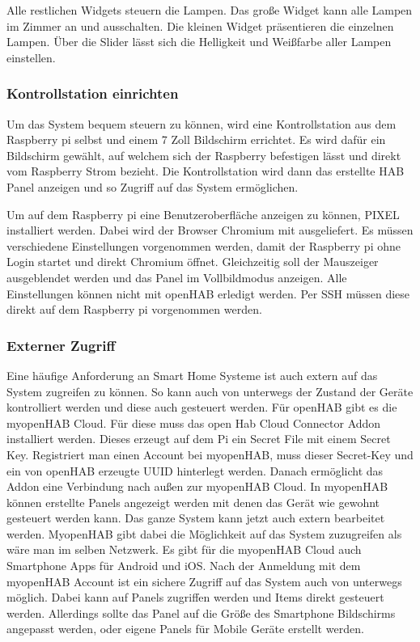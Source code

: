 		Alle restlichen Widgets steuern die Lampen. Das große Widget kann alle Lampen im Zimmer an und ausschalten. Die kleinen Widget präsentieren die einzelnen Lampen. Über die Slider lässt sich die Helligkeit und Weißfarbe aller Lampen einstellen.
		
		\subsubsection{Kontrollstation einrichten}
		Um das System bequem steuern zu können, wird eine Kontrollstation aus dem Raspberry pi selbst und einem 7 Zoll Bildschirm errichtet. Es wird dafür ein Bildschirm gewählt, auf welchem sich der Raspberry befestigen lässt und direkt vom Raspberry Strom bezieht.
		Die Kontrollstation wird dann das erstellte HAB Panel anzeigen und so Zugriff auf das System ermöglichen.

		Um auf dem Raspberry pi eine Benutzeroberfläche anzeigen zu können, PIXEL installiert werden. Dabei wird der Browser Chromium mit ausgeliefert. Es müssen verschiedene Einstellungen vorgenommen werden, damit der Raspberry pi ohne Login startet und direkt Chromium öffnet. Gleichzeitig soll der Mauszeiger ausgeblendet werden und das Panel im Vollbildmodus anzeigen. Alle Einstellungen können nicht mit openHAB erledigt werden. Per SSH müssen diese direkt auf dem Raspberry pi vorgenommen werden.

		\subsubsection{Externer Zugriff}
		Eine häufige Anforderung an Smart Home Systeme ist auch extern auf das System zugreifen zu können. So kann auch von unterwegs der Zustand der Geräte kontrolliert werden und diese auch gesteuert werden. Für openHAB gibt es die myopenHAB Cloud. Für diese muss das open Hab Cloud Connector Addon installiert werden. Dieses erzeugt auf dem Pi ein Secret File mit einem Secret Key. Registriert man einen Account bei myopenHAB, muss dieser Secret-Key und ein von openHAB erzeugte UUID hinterlegt werden. Danach ermöglicht das Addon eine Verbindung nach außen zur myopenHAB Cloud.
		In myopenHAB können erstellte Panels angezeigt werden mit denen das Gerät wie gewohnt gesteuert werden kann. Das ganze System kann jetzt auch extern bearbeitet werden. MyopenHAB gibt dabei die Möglichkeit auf das System zuzugreifen als wäre man im selben Netzwerk.
		Es gibt für die myopenHAB Cloud auch Smartphone Apps für Android und iOS. Nach der Anmeldung mit dem myopenHAB Account ist ein sichere Zugriff auf das System auch von unterwegs möglich. Dabei kann auf Panels zugriffen werden und Items direkt gesteuert werden. Allerdings sollte das Panel auf die Größe des Smartphone Bildschirms angepasst werden, oder eigene Panels für Mobile Geräte erstellt werden.
		
